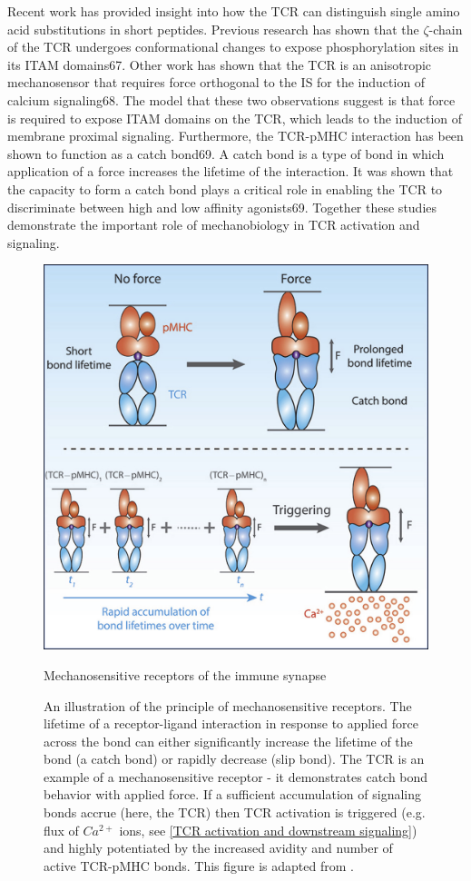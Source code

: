 Recent work has provided insight into how the TCR can distinguish
single amino acid substitutions in short peptides. Previous research has
shown that the $\zeta$-chain of the TCR undergoes conformational changes to
expose phosphorylation sites in its ITAM domains67. Other work has shown
that the TCR is an anisotropic mechanosensor that requires force orthogonal
to the IS for the induction of calcium signaling68. The model that these two
observations suggest is that force is required to expose ITAM domains on the
TCR, which leads to the induction of membrane proximal signaling.
Furthermore, the TCR-pMHC interaction has been shown to function as a
catch bond69. A catch bond is a type of bond in which application of a force
increases the lifetime of the interaction. It was shown that the capacity to form
a catch bond plays a critical role in enabling the TCR to discriminate between
high and low affinity agonists69. Together these studies demonstrate the
important role of mechanobiology in TCR activation and signaling.

\begin{figure}[htbp]
	\centering
	\includegraphics[width=\textwidth]{../figures/chapter1/tcrcatchbond.jpg}
	\caption{Mechanosensitive receptors of the immune synapse}
	\caption*{An illustration of the principle of mechanosensitive receptors. The lifetime of a receptor-ligand interaction in response to applied force across the bond can either significantly increase the lifetime of the bond (a catch bond) or rapidly decrease (slip bond). The TCR is an example of a mechanosensitive receptor -  it demonstrates catch bond behavior with applied force. If a sufficient accumulation of signaling bonds accrue (here, the TCR) then TCR activation is triggered (e.g. flux of $Ca^{2+}$ ions, see \ref{TCR activation and downstream signaling}) and highly potentiated by the increased avidity and number of active TCR-pMHC bonds. This figure is adapted from \cite{Liu2014}.}
	\label{fig:tcrcatchbond}
\end{figure}

